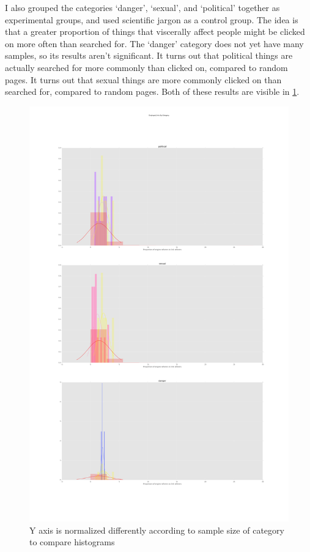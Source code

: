 \documentclass{article}
\begin{document}
I also grouped the categories ‘danger’, ‘sexual’, and ‘political’ together as experimental groups, and used scientific jargon as a control group. The idea is that a greater proportion of things that viscerally affect people might be clicked on more often than searched for. The ‘danger’ category does not yet have many samples, so its results aren’t significant. It turns out that political things are actually searched for more commonly than clicked on, compared to random pages. It turns out that sexual things are more commonly clicked on than searched for, compared to random pages. Both of these results are visible in \cref{fig:clickbait}. 

\begin{figure}
    \includegraphics[width=\textwidth]{results/Clickbait_Engines_Links_By-Category.pdf}
    \caption{Y axis is normalized differently according to sample size of category to compare histograms} \label{fig:clickbait}
\end{figure}
\end{document}
